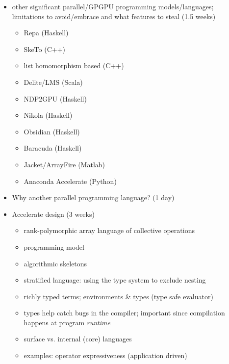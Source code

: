 \begin{itemize}
\item other significant parallel/GPGPU programming models/languages; limitations
    to avoid/embrace and what features to steal (1.5 weeks)
    \begin{itemize}
        \item Repa \cite{Keller:2010er,Lippmeier:2011cd,Lippmeier:2012gx} (Haskell)
        \item SkeTo \cite{Matsuzaki:2011ew} (C++)
        \item list homomorphism based \cite{Sato:2009cq} (C++)
        \item Delite/LMS \cite{Rompf:2013er} (Scala)
        \item NDP2GPU \cite{Bergstrom:2012bi} (Haskell)
        \item Nikola \cite{Mainland:2010vj} (Haskell)
        \item Obsidian \cite{Svensson:2008a,Claessen:2012hl} (Haskell)
        \item Baracuda \cite{Larsen:2011fa} (Haskell)
        \item Jacket/ArrayFire \cite{AccelerEyes:vq} (Matlab)
        \item Anaconda Accelerate \cite{AnacondaAccelerate:2013vn} (Python)
    \end{itemize}

    \item Why another parallel programming language? (1 day)

    \item Accelerate design (3 weeks)
        \begin{itemize}
            \item rank-polymorphic array language of collective operations
            \item programming model
            \item algorithmic skeletons
            \item stratified language: using the type system to exclude nesting
            \item richly typed terms; environments \& types (type safe evaluator)
            \item types help catch bugs in the compiler; important since
                compilation happens at program \emph{runtime}
            \item surface vs. internal (core) languages
            \item examples: operator expressiveness (application driven)
        \end{itemize}

\end{itemize}


